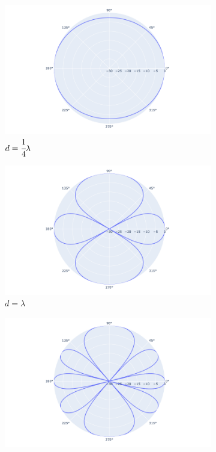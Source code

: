 \begin{figure}[ht]
  \begin{subfigure}[b]{0.32\textwidth}
    \includegraphics[width=\textwidth]{src/assets/pictures/theory/beam_n2_d0.25.png}
    \caption{$d = \cfrac{1}{4}\lambda$}
    \label{fig:theory:beam:d.25}
  \end{subfigure}
  \hfill
  \begin{subfigure}[b]{0.32\textwidth}
    \includegraphics[width=\textwidth]{src/assets/pictures/theory/beam_n2_d1.png}
    \caption{$d = \lambda$}
    \label{fig:theory:beam:d1}
  \end{subfigure}
  \hfill
  \begin{subfigure}[b]{0.32\textwidth}
    \includegraphics[width=\textwidth]{src/assets/pictures/theory/beam_n2_d2.png}

\end{subfigure}
\end{figure}
